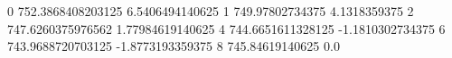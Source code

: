 0 752.3868408203125 6.5406494140625
1 749.97802734375 4.1318359375
2 747.6260375976562 1.77984619140625
4 744.6651611328125 -1.1810302734375
6 743.9688720703125 -1.8773193359375
8 745.84619140625 0.0
